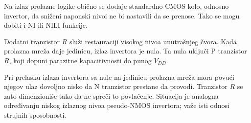 Na izlaz prolazne logike obično se dodaje standardno CMOS kolo, odnosno invertor, da sniženi naponski nivoi ne bi nastavili da se prenose. Tako se mogu dobiti i NI ili NILI funkcije.

Dodatni tranzistor $R$ služi restauraciji visokog nivoa unutrašnjeg čvora. Kada prolazna mreža daje jedinicu, izlaz invertora je nula. Ta nula uključi P tranzistor $R$, koji dopuni parazitne kapacitivnosti do punog $V_{DD}$.

Pri prelasku izlaza invertora sa nule na jedinicu prolazna mreža mora povući njegov ulaz dovoljno nisko da N tranzistor prestane da provodi. Tranzistor $R$ se zato dimenzioniše tako da ne spreči to povlačenje. Situacija je analogna određivanju niskog izlaznog nivoa pseudo-NMOS invertora; važe isti odnosi strujnih sposobnosti.
